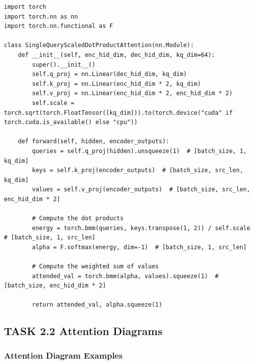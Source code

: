 \documentclass{article}
\begin{document}
\begin{lstlisting}[caption={SingleQueryScaledDotProductAttention Class}, label={lst:scaled_dot_product}]
import torch
import torch.nn as nn
import torch.nn.functional as F

class SingleQueryScaledDotProductAttention(nn.Module):
    def __init__(self, enc_hid_dim, dec_hid_dim, kq_dim=64):
        super().__init__()
        self.q_proj = nn.Linear(dec_hid_dim, kq_dim)
        self.k_proj = nn.Linear(enc_hid_dim * 2, kq_dim)
        self.v_proj = nn.Linear(enc_hid_dim * 2, enc_hid_dim * 2)
        self.scale = torch.sqrt(torch.FloatTensor([kq_dim])).to(torch.device("cuda" if torch.cuda.is_available() else "cpu"))

    def forward(self, hidden, encoder_outputs):
        queries = self.q_proj(hidden).unsqueeze(1)  # [batch_size, 1, kq_dim]
        keys = self.k_proj(encoder_outputs)  # [batch_size, src_len, kq_dim]
        values = self.v_proj(encoder_outputs)  # [batch_size, src_len, enc_hid_dim * 2]

        # Compute the dot products
        energy = torch.bmm(queries, keys.transpose(1, 2)) / self.scale  # [batch_size, 1, src_len]
        alpha = F.softmax(energy, dim=-1)  # [batch_size, 1, src_len]

        # Compute the weighted sum of values
        attended_val = torch.bmm(alpha, values).squeeze(1)  # [batch_size, enc_hid_dim * 2]

        return attended_val, alpha.squeeze(1)
\end{lstlisting}

\pagebreak

\subsection*{TASK 2.2 Attention Diagrams}

\subsubsection*{Attention Diagram Examples}
\end{document}
